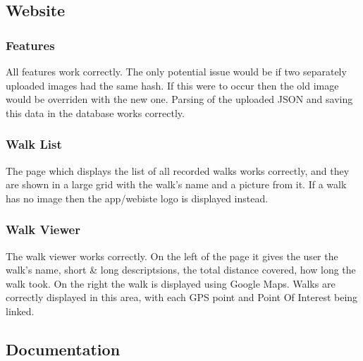 \documentclass{project}
\begin{document}
\subsection{Website}
\subsubsection{Features}
All features work correctly. The only potential issue would be if two separately uploaded images had the same hash. If this
were to occur then the old image would be overriden with the new one.
Parsing of the uploaded JSON and saving this data in the database works correctly.

\subsubsection{Walk List}
The page which displays the list of all recorded walks works correctly, and they are shown in a large grid with the walk's
name and a picture from it.
If a walk has no image then the app/webiste logo is displayed instead.


\subsubsection{Walk Viewer}
The walk viewer works correctly. On the left of the page it gives the user the walk's name, short \& long descriptsions, the total distance covered,
how long the walk took. On the right the walk is displayed using Google Maps. Walks are correctly displayed in this area, with each GPS point and Point Of Interest being linked.

\subsection{Documentation}


\end{document}
